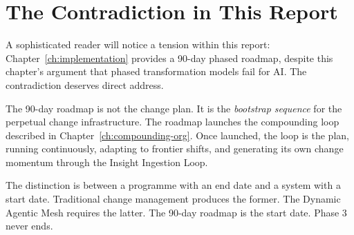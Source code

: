 \section{The Contradiction in This Report}

A sophisticated reader will notice a tension within this report: Chapter~\ref{ch:implementation} provides a 90-day phased roadmap, despite this chapter's argument that phased transformation models fail for AI. The contradiction deserves direct address.

The 90-day roadmap is not the change plan. It is the \emph{bootstrap sequence} for the perpetual change infrastructure. The roadmap launches the compounding loop described in Chapter~\ref{ch:compounding-org}. Once launched, the loop is the plan, running continuously, adapting to frontier shifts, and generating its own change momentum through the Insight Ingestion Loop.

The distinction is between a programme with an end date and a system with a start date. Traditional change management produces the former. The Dynamic Agentic Mesh requires the latter. The 90-day roadmap is the start date. Phase 3 never ends.
